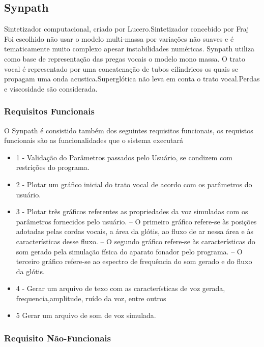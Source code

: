 	
	\subsection{Synpath}
		Sintetizador computacional, criado por Lucero.Sintetizador concebido por Fraj \cite{JeanFrancis}
		Foi escolhido não usar o modelo multi-massa por variações não suaves  e é tematicamente muito complexo apesar instabilidades numéricas.
		Synpath utiliza como base de representação das pregas vocais o modelo mono massa. O trato vocal é representado por uma concatenação de tubos cilindricos os quais se propagam uma onda acustica.Superglótica não leva em conta o trato vocal.Perdas e viscosidade são considerada.
	
		\subsubsection{Requisitos Funcionais}
		
		O Synpath é consistido também dos seguintes requisitos funcionais, os requistos funcionais são as funcionalidades que o sistema executará\cite{SWEBOK}
		
		\begin{itemize}
			\item 1 - Validação do Parâmetros passados pelo Usuário, se condizem com restrições do programa.
			\item 2 - Plotar um gráﬁco inicial do trato vocal de acordo com os parâmetros do usuário.
			\item 3 - Plotar três gráﬁcos referentes as propriedades da voz simuladas com os parâmetros fornecidos pelo usuário. – O primeiro gráﬁco refere-se às posições adotadas pelas cordas vocais, a área da glótis, ao ﬂuxo de ar nessa área e às características desse ﬂuxo. – O segundo gráﬁco refere-se às características do som gerado pela simulação física do aparato fonador pelo programa. – O terceiro gráﬁco refere-se ao espectro de frequência do som gerado e do ﬂuxo da glótis.
			\item 4 - Gerar um arquivo de texo com as características de voz gerada, frequencia,amplitude, ruído da voz, entre outros
			\item 5 Gerar um arquivo de som de voz simulada.
		\end{itemize}
		
		\subsubsection{Requisito Não-Funcionais}
		
